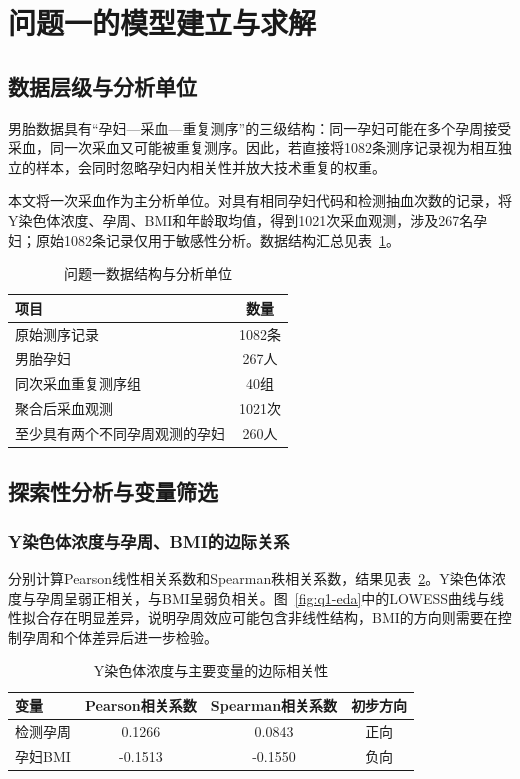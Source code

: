 \section{问题一的模型建立与求解}

\subsection{数据层级与分析单位}

男胎数据具有“孕妇---采血---重复测序”的三级结构：同一孕妇可能在多个孕周接受采血，同一次采血又可能被重复测序。因此，若直接将1082条测序记录视为相互独立的样本，会同时忽略孕妇内相关性并放大技术重复的权重。

本文将一次采血作为主分析单位。对具有相同孕妇代码和检测抽血次数的记录，将Y染色体浓度、孕周、BMI和年龄取均值，得到1021次采血观测，涉及267名孕妇；原始1082条记录仅用于敏感性分析。数据结构汇总见表~\ref{tab:q1-data-summary}。

\begin{table}[H]
  \centering
  \caption{问题一数据结构与分析单位}
  \label{tab:q1-data-summary}
  \begin{tabular}{lc}
    \toprule
    项目 & 数量 \\
    \midrule
    原始测序记录 & 1082条 \\
    男胎孕妇 & 267人 \\
    同次采血重复测序组 & 40组 \\
    聚合后采血观测 & 1021次 \\
    至少具有两个不同孕周观测的孕妇 & 260人 \\
    \bottomrule
  \end{tabular}
\end{table}

\subsection{探索性分析与变量筛选}

\subsubsection{Y染色体浓度与孕周、BMI的边际关系}

分别计算Pearson线性相关系数和Spearman秩相关系数，结果见表~\ref{tab:q1-correlation}。Y染色体浓度与孕周呈弱正相关，与BMI呈弱负相关。图~\ref{fig:q1-eda}中的LOWESS曲线与线性拟合存在明显差异，说明孕周效应可能包含非线性结构，BMI的方向则需要在控制孕周和个体差异后进一步检验。

\begin{table}[H]
  \centering
  \caption{Y染色体浓度与主要变量的边际相关性}
  \label{tab:q1-correlation}
  \begin{tabular}{lccc}
    \toprule
    变量 & Pearson相关系数 & Spearman相关系数 & 初步方向 \\
    \midrule
    检测孕周 & 0.1266 & 0.0843 & 正向 \\
    孕妇BMI & -0.1513 & -0.1550 & 负向 \\
    \bottomrule
  \end{tabular}
\end{table}

